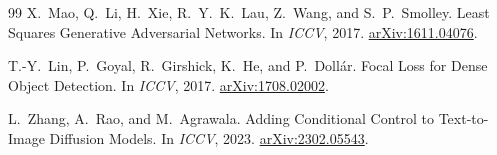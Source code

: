 \documentclass[11pt]{article}
\begin{document}
\begin{thebibliography}{99}
X.~Mao, Q.~Li, H.~Xie, R.~Y.~K.~Lau, Z.~Wang, and S.~P.~Smolley.
\newblock Least Squares Generative Adversarial Networks.
\newblock In \emph{ICCV}, 2017. \href{https://arxiv.org/abs/1611.04076}{arXiv:1611.04076}.

T.-Y.~Lin, P.~Goyal, R.~Girshick, K.~He, and P.~Doll{\'a}r.
\newblock Focal Loss for Dense Object Detection.
\newblock In \emph{ICCV}, 2017. \href{https://arxiv.org/abs/1708.02002}{arXiv:1708.02002}.

L.~Zhang, A.~Rao, and M.~Agrawala.
\newblock Adding Conditional Control to Text-to-Image Diffusion Models.
\newblock In \emph{ICCV}, 2023. \href{https://arxiv.org/abs/2302.05543}{arXiv:2302.05543}.

\end{thebibliography}
\end{document}
